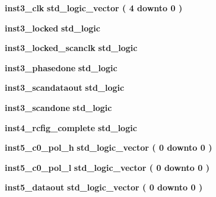 \begin{DoxyCompactItemize}
\item 
{\bf inst3\+\_\+clk} {\bfseries \textcolor{comment}{std\+\_\+logic\+\_\+vector}\textcolor{vhdlchar}{ }\textcolor{vhdlchar}{(}\textcolor{vhdlchar}{ }\textcolor{vhdlchar}{ } \textcolor{vhdldigit}{4} \textcolor{vhdlchar}{ }\textcolor{keywordflow}{downto}\textcolor{vhdlchar}{ }\textcolor{vhdlchar}{ } \textcolor{vhdldigit}{0} \textcolor{vhdlchar}{ }\textcolor{vhdlchar}{)}\textcolor{vhdlchar}{ }} 
\item 
{\bf inst3\+\_\+locked} {\bfseries \textcolor{comment}{std\+\_\+logic}\textcolor{vhdlchar}{ }} 
\item 
{\bf inst3\+\_\+locked\+\_\+scanclk} {\bfseries \textcolor{comment}{std\+\_\+logic}\textcolor{vhdlchar}{ }} 
\item 
{\bf inst3\+\_\+phasedone} {\bfseries \textcolor{comment}{std\+\_\+logic}\textcolor{vhdlchar}{ }} 
\item 
{\bf inst3\+\_\+scandataout} {\bfseries \textcolor{comment}{std\+\_\+logic}\textcolor{vhdlchar}{ }} 
\item 
{\bf inst3\+\_\+scandone} {\bfseries \textcolor{comment}{std\+\_\+logic}\textcolor{vhdlchar}{ }} 
\item 
{\bf inst4\+\_\+rcfig\+\_\+complete} {\bfseries \textcolor{comment}{std\+\_\+logic}\textcolor{vhdlchar}{ }} 
\item 
{\bf inst5\+\_\+c0\+\_\+pol\+\_\+h} {\bfseries \textcolor{comment}{std\+\_\+logic\+\_\+vector}\textcolor{vhdlchar}{ }\textcolor{vhdlchar}{(}\textcolor{vhdlchar}{ }\textcolor{vhdlchar}{ } \textcolor{vhdldigit}{0} \textcolor{vhdlchar}{ }\textcolor{keywordflow}{downto}\textcolor{vhdlchar}{ }\textcolor{vhdlchar}{ } \textcolor{vhdldigit}{0} \textcolor{vhdlchar}{ }\textcolor{vhdlchar}{)}\textcolor{vhdlchar}{ }} 
\item 
{\bf inst5\+\_\+c0\+\_\+pol\+\_\+l} {\bfseries \textcolor{comment}{std\+\_\+logic\+\_\+vector}\textcolor{vhdlchar}{ }\textcolor{vhdlchar}{(}\textcolor{vhdlchar}{ }\textcolor{vhdlchar}{ } \textcolor{vhdldigit}{0} \textcolor{vhdlchar}{ }\textcolor{keywordflow}{downto}\textcolor{vhdlchar}{ }\textcolor{vhdlchar}{ } \textcolor{vhdldigit}{0} \textcolor{vhdlchar}{ }\textcolor{vhdlchar}{)}\textcolor{vhdlchar}{ }} 
\item 
{\bf inst5\+\_\+dataout} {\bfseries \textcolor{comment}{std\+\_\+logic\+\_\+vector}\textcolor{vhdlchar}{ }\textcolor{vhdlchar}{(}\textcolor{vhdlchar}{ }\textcolor{vhdlchar}{ } \textcolor{vhdldigit}{0} \textcolor{vhdlchar}{ }\textcolor{keywordflow}{downto}\textcolor{vhdlchar}{ }\textcolor{vhdlchar}{ } \textcolor{vhdldigit}{0} \textcolor{vhdlchar}{ }\textcolor{vhdlchar}{)}\textcolor{vhdlchar}{ }} 

\end{DoxyCompactItemize}
